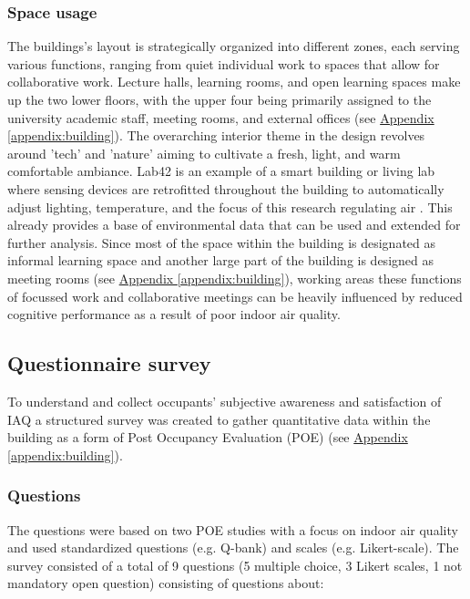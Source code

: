 \subsubsection{Space usage}

The buildings's layout is strategically organized into different zones, each serving various functions, ranging from quiet individual work to spaces that allow for collaborative work. Lecture halls, learning rooms, and open learning spaces make up the two lower floors, with the upper four being primarily assigned to the university academic staff, meeting rooms, and external offices (see \hyperref[appendix:building]{Appendix \ref*{appendix:building}}). The overarching interior theme in the design revolves around 'tech' and 'nature' aiming to cultivate a fresh, light, and warm comfortable ambiance. Lab42 is an example of a smart building or living lab where sensing devices are retrofitted throughout the building to automatically adjust lighting, temperature, and the focus of this research regulating air \cite{architects_lab42_2022}. This already provides a base of environmental data that can be used and extended for further analysis. Since most of the space within the building is designated as informal learning space and another large part of the building is designed as meeting rooms (see \hyperref[appendix:building]{Appendix \ref*{appendix:building}}), working areas these functions of focussed work and collaborative meetings can be heavily influenced by reduced cognitive performance as a result of poor indoor air quality.

\subsection{Questionnaire survey}
\label{sec:questionnaire}

To understand and collect occupants' subjective awareness and satisfaction of IAQ a structured survey was created to gather quantitative data within the building as a form of Post Occupancy Evaluation (POE) (see \hyperref[appendix:building]{Appendix \ref*{appendix:building}}).


\subsubsection{Questions}
The questions were based on two POE studies with a focus on indoor air quality \cite{silva_post-occupancy_2017, son_perceived_2023} and used standardized questions (e.g. Q-bank) and scales (e.g. Likert-scale). The survey consisted of a total of 9 questions (5 multiple choice, 3 Likert scales, 1 not mandatory open question) consisting of questions about:

